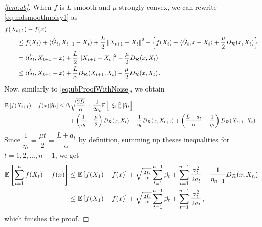 \begin{proof}[\cref{lem:ub}]
When $f$ is $L$-smooth and $\mu$-strongly convex,  we can rewrite \eqref{eq:mdsmoothnoisy1} as
\begin{align*}
\MoveEqLeft
f(X_{t+1}) - f(x) \nonumber\\
 &\le f(X_t) + \ip{ \hat{G}_t, X_{t+1}-X_t } + \frac{L}{2} \norm{X_{t+1}-X_t}^2 - \left\{ f(X_t) + \ip{ \hat{G}_t, x-X_t}+\dfrac{\mu}{2}\DR(x, X_t) \right\} \nonumber \\
 &= \ip{\hat{G}_t, X_{t+1} - x } +  \frac{L}{2} \norm{X_{t+1}-X_t}^2-\dfrac{\mu}{2}\DR(x, X_t) \nonumber\\
 &\le \ip{\hat{G}_t,X_{t+1}-x} + \frac{L}{\alpha} D_{\mathcal{R}}(X_{t+1},X_t)-\dfrac{\mu}{2}\DR(x, X_t)\,.
\end{align*}
Now, similarly to \eqref{eq:ubProofWithNoise}, we  obtain
\begin{align*}
\mathbb{E}\left[f(X_{t+1}) - f(x) |\mathfrak{F}_{t} \right]
& \le
 \beta_t \sqrt{ \frac{2D}{\alpha} }+
\frac{1}{2a_t}  \mathbb{E}\left[\left\|\xi_t\right\|_*^2|\mathfrak{F}_{t}\right]\\
&\qquad +\left(\dfrac{1}{\eta_t}-\dfrac{\mu}{2}  \right)D_{\mathcal{R}}(x,X_t)-\dfrac{1}{\eta_t}D_{\mathcal{R}}(x,X_{t+1})
+\left( \dfrac{L+a_t}{\alpha}-\dfrac{1}{\eta_t} \right)D_{\mathcal{R}}(X_{t+1},X_t) \,.
\end{align*}
Since $\dfrac{1}{\eta_t}=\dfrac{\mu t}{2}=\dfrac{L+a_t}{\alpha}$ by definition, summing up theses inequalities for $t=1,2,\ldots,n-1$, we get
\begin{align*}
 \mathbb{E}\left[ \sum_{t=1}^n f(X_t) - f(x) \right]
& \le
  \mathbb{E}\left[f(X_1)-f(x)\right] + \sqrt{\tfrac{2D}{\alpha}} \sum_{t=1}^{n-1} \beta_t +
	  \sum_{t=1}^{n-1}\frac{\sigma_t^2}{2a_t}-\dfrac{1}{\eta_{n-1}}D_{\mathcal{R}}(x,X_{n})\\
& \le
  \mathbb{E}\left[f(X_1)-f(x)\right] + \sqrt{\tfrac{2D}{\alpha}} \sum_{t=1}^{n-1} \beta_t +
	  \sum_{t=1}^{n-1}\frac{\sigma_t^2}{2a_t}\,,
\end{align*}
which finishes the proof.
\end{proof}


